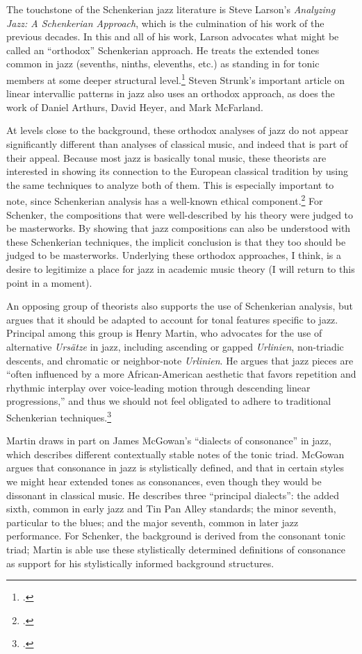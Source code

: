 \documentclass[diss]{subfiles}
\begin{document}
The touchstone of the Schenkerian jazz literature is Steve Larson’s
\emph{Analyzing Jazz: A Schenkerian Approach}, which is the culmination of his
work of the previous decades. In this and all of his work, Larson
advocates what might be called an “orthodox” Schenkerian approach. He treats
the extended tones common in jazz (sevenths, ninths, elevenths, etc.) as
standing in for tonic members at some deeper structural
level.\footcite[6]{larson:2009} Steven Strunk’s important article on linear
intervallic patterns in jazz also uses an orthodox approach, as does the work
of Daniel Arthurs, David Heyer, and Mark McFarland.

At levels close to the background, these orthodox analyses of jazz do not
appear significantly different than analyses of classical music, and indeed
that is part of their appeal. Because most jazz is basically tonal
music, these theorists are interested in showing its connection to the
European classical tradition by using the same techniques to analyze both of
them. This is especially important to note, since Schenkerian analysis has a
well-known ethical component.\footcite{cook:1989} For Schenker, the
compositions that were well-described by his theory were judged to be
masterworks. By showing that jazz compositions can also be understood with
these Schenkerian techniques, the implicit conclusion is that they too should
be judged to be masterworks. Underlying these orthodox approaches, I think, is
a desire to legitimize a place for jazz in academic music theory (I will
return to this point in a moment).

An opposing group of theorists also supports the use of Schenkerian analysis,
but argues that it should be adapted to account for tonal features specific to
jazz. Principal among this group is Henry Martin, who advocates for the use of
alternative \emph{Ursätze} in jazz, including ascending or gapped
\emph{Urlinien}, non-triadic descents, and chromatic or neighbor-note
\emph{Urlinien}. He argues that jazz pieces are “often influenced by
a more African-American aesthetic that favors repetition and rhythmic
interplay over voice-leading motion through descending linear progressions,”
and thus we should not feel obligated to adhere to traditional Schenkerian
techniques.\footcite[7]{martin:2011}

Martin draws in part on James McGowan’s “dialects of consonance” in jazz,
which describes different contextually stable notes of the tonic triad.
McGowan argues that consonance in jazz is stylistically defined, and that in
certain styles we might hear extended tones as consonances, even though they
would be dissonant in classical music. He describes three “principal dialects”:
the added sixth, common in early jazz and Tin Pan Alley standards; the minor
seventh, particular to the blues; and the major seventh, common in later jazz
performance. For Schenker, the background is derived from the
consonant tonic triad; Martin is able use these stylistically determined
definitions of consonance as support for his stylistically informed background
structures.
\end{document}
